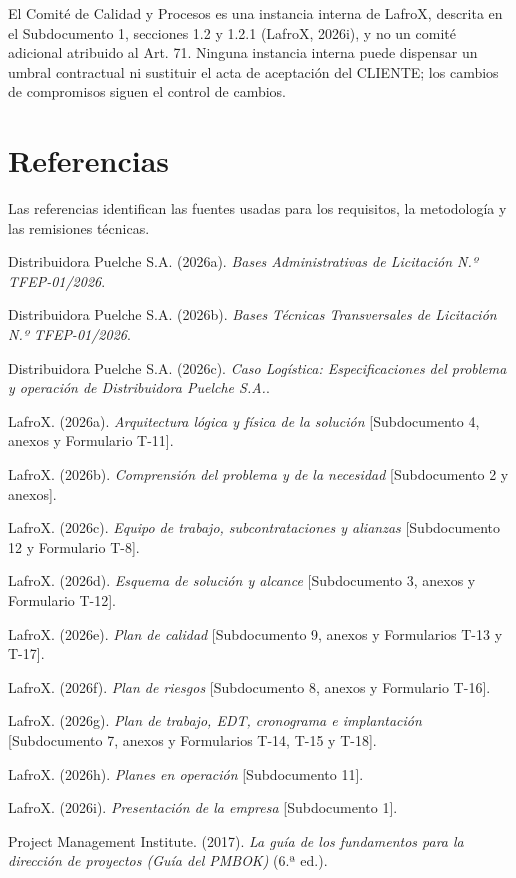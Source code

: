 \documentclass[carta,firma,final]{lafrox}
\begin{document}
El Comité de Calidad y Procesos es una instancia interna de LafroX, descrita en el Subdocumento 1, secciones 1.2 y 1.2.1 (LafroX, 2026i), y no un comité adicional atribuido al Art. 71. Ninguna instancia interna puede dispensar un umbral contractual ni sustituir el acta de aceptación del CLIENTE; los cambios de compromisos siguen el control de cambios.

\section*{Referencias}

Las referencias identifican las fuentes usadas para los requisitos, la metodología y las remisiones técnicas.

\begin{list}{}{\setlength{\leftmargin}{1.27cm}\setlength{\itemindent}{-1.27cm}\setlength{\itemsep}{3pt}\setlength{\parsep}{0pt}}

  \item Distribuidora Puelche S.A. (2026a). \textit{Bases Administrativas de Licitación N.º TFEP-01/2026}.
  \item Distribuidora Puelche S.A. (2026b). \textit{Bases Técnicas Transversales de Licitación N.º TFEP-01/2026}.
  \item Distribuidora Puelche S.A. (2026c). \textit{Caso Logística: Especificaciones del problema y operación de Distribuidora Puelche S.A.}.
  \item LafroX. (2026a). \textit{Arquitectura lógica y física de la solución} [Subdocumento 4, anexos y Formulario T-11].
  \item LafroX. (2026b). \textit{Comprensión del problema y de la necesidad} [Subdocumento 2 y anexos].
  \item LafroX. (2026c). \textit{Equipo de trabajo, subcontrataciones y alianzas} [Subdocumento 12 y Formulario T-8].
  \item LafroX. (2026d). \textit{Esquema de solución y alcance} [Subdocumento 3, anexos y Formulario T-12].
  \item LafroX. (2026e). \textit{Plan de calidad} [Subdocumento 9, anexos y Formularios T-13 y T-17].
  \item LafroX. (2026f). \textit{Plan de riesgos} [Subdocumento 8, anexos y Formulario T-16].
  \item LafroX. (2026g). \textit{Plan de trabajo, EDT, cronograma e implantación} [Subdocumento 7, anexos y Formularios T-14, T-15 y T-18].
  \item LafroX. (2026h). \textit{Planes en operación} [Subdocumento 11].
  \item LafroX. (2026i). \textit{Presentación de la empresa} [Subdocumento 1].
  \item Project Management Institute. (2017). \textit{La guía de los fundamentos para la dirección de proyectos (Guía del PMBOK)} (6.ª ed.).
\end{list}
\end{document}
